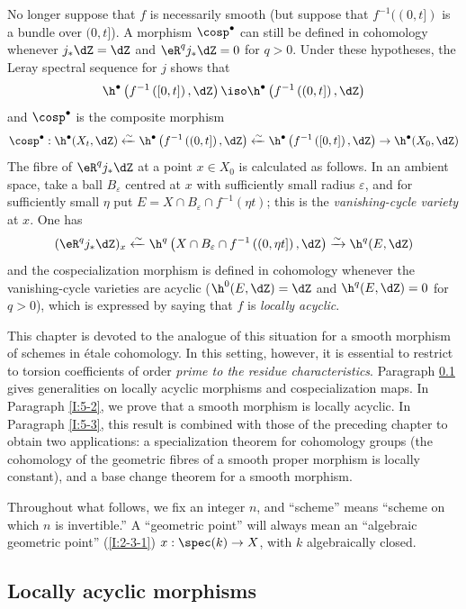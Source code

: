 \documentclass[oneside]{book}
\begin{document}
No longer suppose that $f$ is necessarily smooth (but suppose that
$f^{-1}((0,t])$ is a bundle over $(0,t]$). A morphism
$\cosp^\bullet$ can still be defined in cohomology whenever
$j_*\dZ=\dZ$ and $\eR^qj_*\dZ=0$ for $q>0$. Under these hypotheses,
the Leray spectral sequence for $j$ shows that
\[
  \h^\bullet\left(f^{-1}\left([0,t]\right),\dZ\right) \iso \h^\bullet\left(f^{-1}\left((0,t]\right),\dZ\right)
\]
and $\cosp^\bullet$ is the composite morphism
\[
  \cosp^\bullet : \h^\bullet(X_t,\dZ)
    \xleftarrow\sim \h^\bullet\left(f^{-1}\left((0,t]\right),\dZ\right)
    \xleftarrow\sim \h^\bullet\left(f^{-1}\left([0,t]\right),\dZ\right)
    \to \h^\bullet(X_0,\dZ)
\]
The fibre of $\eR^qj_*\dZ$ at a point $x\in X_0$ is calculated as
follows. In an ambient space, take a ball $B_\varepsilon$ centred at $x$
with sufficiently small radius $\varepsilon$, and for sufficiently small
$\eta$ put $E=X\cap B_\varepsilon\cap f^{-1}(\eta t)$; this is the
\emph{vanishing-cycle variety} at $x$. One has
\[
  (\eR^q j_* \dZ)_x \xleftarrow\sim \h^q\left(X\cap B_\varepsilon\cap f^{-1}\left((0,\eta t]\right),\dZ\right) \xrightarrow\sim \h^q(E,\dZ)
\]
and the cospecialization morphism is defined in cohomology whenever the
vanishing-cycle varieties are acyclic
($\h^0(E,\dZ)=\dZ$ and $\h^q(E,\dZ)=0$ for $q>0$), which is expressed
by saying that $f$ is \emph{locally acyclic}.

This chapter is devoted to the analogue of this situation for a smooth
morphism of schemes in étale cohomology. In this setting, however, it is
essential to restrict to torsion coefficients of order \emph{prime to the
residue characteristics}. Paragraph \ref{I:5-1} gives generalities on
locally acyclic morphisms and cospecialization maps. In Paragraph
\ref{I:5-2}, we prove that a smooth morphism is locally acyclic. In
Paragraph \ref{I:5-3}, this result is combined with those of the preceding
chapter to obtain two applications: a specialization theorem for
cohomology groups (the cohomology of the geometric fibres of a smooth
proper morphism is locally constant), and a base change theorem for a
smooth morphism.

Throughout what follows, we fix an integer $n$, and “scheme” means
“scheme on which $n$ is invertible.” A “geometric point” will always mean
an “algebraic geometric point” (\ref{I:2-3-1})
$x:\spec(k)\to X$, with $k$ algebraically closed.

\subsection{Locally acyclic morphisms}\label{I:5-1}
\end{document}
